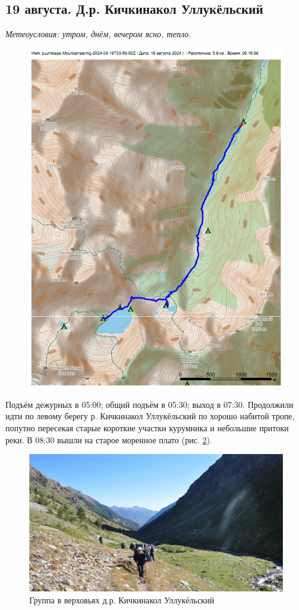 \subsection{19 августа. Д.р. Кичкинакол Уллукёльский}
\textit{Метеоусловия: утром, днём, вечером ясно, тепло.}

\begin{figure}[h!]
	\centering
	\includegraphics[angle=0, width=0.7\linewidth]{../pics/mini_maps/19}
	\label{fig:mini_19}
\end{figure}

Подъём дежурных в 05:00; общий подъём в 05:30; выход в 07:30.
Продолжили идти по левому берегу р. Кичкинакол Уллукёльский по хорошо набитой тропе, попутно  пересекая старые короткие участки курумника и небольшие притоки реки. В 08:30 вышли на старое моренное плато (рис. \ref{fig:DSC_0692}).

\begin{figure}[h!]
	\centering
	\includegraphics[width=0.7\linewidth]{../pics/DSC_0692}
	\caption{Группа в верховьях д.р. Кичкинакол Уллукёльский}
	\label{fig:DSC_0692}
\end{figure}

